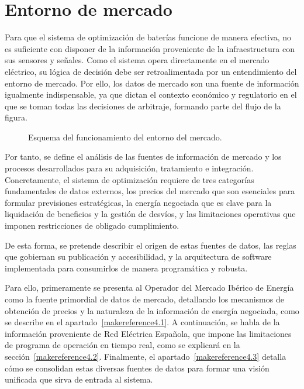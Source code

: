 \cleardoublepage

\chapter{Entorno de mercado}
\label{makereference4}

Para que el sistema de optimización de baterías funcione de manera efectiva, no es suficiente con disponer de la información proveniente de la infraestructura con sus sensores y señales. Como el sistema opera directamente en el mercado eléctrico, su lógica de decisión debe ser retroalimentada por un entendimiento del entorno de mercado. Por ello, los datos de mercado son una fuente de información igualmente indispensable, ya que dictan el contexto económico y regulatorio en el que se toman todas las decisiones de arbitraje, formando parte del flujo de la figura.

\begin{figure}
  \centering
  \caption{Esquema del funcionamiento del entorno del mercado.}
  \label{fig:esquema-mercado}
\end{figure}

Por tanto, se define el análisis de las fuentes de información de mercado y los procesos desarrollados para su adquisición, tratamiento e integración. Concretamente, el sistema de optimización requiere de tres categorías fundamentales de datos externos, los precios del mercado que son esenciales para formular previsiones estratégicas, la energía negociada que es clave para la liquidación de beneficios y la gestión de desvíos, y las limitaciones operativas que imponen restricciones de obligado cumplimiento.

De esta forma, se pretende describir el origen de estas fuentes de datos, las reglas que gobiernan su publicación y accesibilidad, y la arquitectura de software implementada para consumirlos de manera programática y robusta.

Para ello, primeramente se presenta al Operador del Mercado Ibérico de Energía como la fuente primordial de datos de mercado, detallando los mecanismos de obtención de precios y la naturaleza de la información de energía negociada, como se describe en el apartado~\ref{makereference4.1}. A continuación, se habla de la información proveniente de Red Eléctrica Española, que impone las limitaciones de programa de operación en tiempo real, como se explicará en la sección~\ref{makereference4.2}. Finalmente, el apartado~\ref{makereference4.3} detalla cómo se consolidan estas diversas fuentes de datos para formar una visión unificada que sirva de entrada al sistema.

